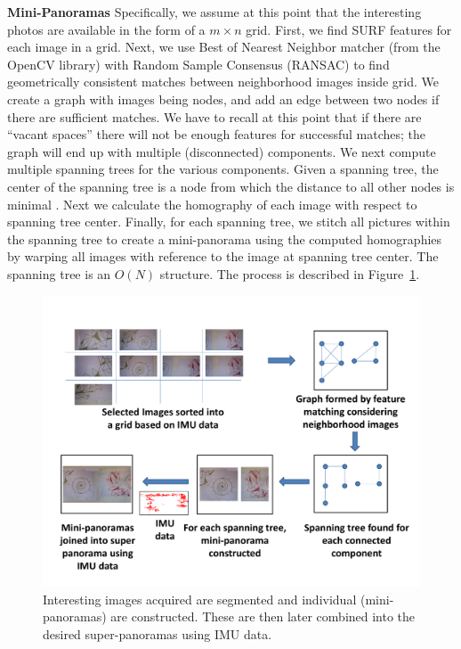 {\bf Mini-Panoramas} Specifically, we assume at this point that the
interesting photos are available in the form of a $m \times n$
grid. First, we find SURF \cite{Bay} features for each image in a
grid. Next, we use Best of Nearest Neighbor matcher (from the OpenCV
library) with Random Sample Consensus (RANSAC) \cite{Fischler1981} to
find geometrically consistent matches between neighborhood images
inside grid.  We create a graph with images being nodes, and add an
edge between two nodes if there are sufficient matches. We have to
recall at this point that if there are ``vacant spaces'' there will
not be enough features for successful matches; the graph will end up
with multiple (disconnected) components.  We next compute multiple
spanning trees for the various components. Given a spanning tree, the
center of the spanning tree is a node from which the distance to all
other nodes is minimal \cite{Kocay}. Next we calculate the homography
of each image with respect to spanning tree center.  Finally, for each
spanning tree, we stitch all pictures within the spanning tree to
create a mini-panorama using the computed homographies by warping all
images with reference to the image at spanning tree center. The
spanning tree is an $O(N)$ structure. The process is described in
Figure~\ref{fig:graph}.

\begin{figure}[t!]
  \centering
  \includegraphics[width=\textwidth]{figures/vacantSpaces/graphCreation} 
  \caption[Creation of Mini-panoramas]{ \label{fig:graph} Interesting images
  acquired are segmented and individual (mini-panoramas) are constructed. These
    are then later combined into the desired super-panoramas using IMU data.}
\end{figure}    

